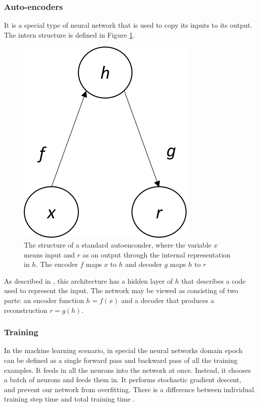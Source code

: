 \subsubsection{Auto-encoders}\label{auto-encoder}

It is a special type of neural network that is used to copy its inputs to its output. The intern structure is defined in Figure \ref{fig:autoencoder}. 

\begin{figure}[H]
\centering
\includegraphics[scale=0.7]{imagens/autoencoder.png}
\caption{The structure of a standard autoenconder, where the variable $x$ means input and $r$ as an output through the internal representation in $h$. The encoder $f$ maps $x$ to $h$ and decoder $g$ maps $h$ to $r$}
\label{fig:autoencoder}
\end{figure}

As described in \cite{yang2020feedback}, this architecture has a hidden layer of $h$ that describes a code used to represent the input. The network may be viewed as consisting of two parts: an encoder function $h=f(x)$ and a decoder that produces a reconstruction $r=g(h)$.

\subsubsection{Training}

In the machine learning scenario, in special the neural networks domain epoch can be defined as a single forward pass and backward pass of all the training examples. It feeds in all the neurons into the network at once. Instead, it chooses a batch of neurons and feeds them in. It performs stochastic gradient descent, and prevent our network from overfitting. There is a difference between individual training step time and total training time \cite{pascanu2013difficulty}. 


